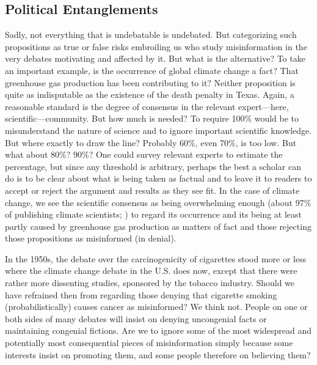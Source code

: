 \documentclass[11pt]{article}
\begin{document}
\subsection{Political Entanglements}

Sadly, not everything that is undebatable is undebated. But categorizing such propositions as true or false risks embroiling us who study misinformation in the very debates motivating and affected by it. But what is the alternative? To take an important example, is the occurrence of global climate change a fact? That greenhouse gas production has been contributing to it? Neither proposition is quite as indisputable as the existence of the death penalty in Texas. Again, a reasonable standard is the degree of consensus in the relevant expert---here, scientific---community. But how much is needed? To require 100\% would be to misunderstand the nature of science and to ignore important scientific knowledge. But where exactly to draw the line? Probably 60\%, even 70\%, is too low. But what about 80\%? 90\%? One could survey relevant experts to estimate the percentage, but since any threshold is arbitrary, perhaps the best a scholar can do is to be clear about what is being taken as factual and to leave it to readers to accept or reject the argument and results as they see fit. In the case of climate change, we see the scientific consensus as being overwhelming enough (about 97\% of publishing climate scientists; \citealt{cook2016}) to regard its occurrence and its being at least partly caused by greenhouse gas production as matters of fact \citep{ipcc2013} and those rejecting those propositions as misinformed (in denial).

In the 1950s, the debate over the carcinogenicity of cigarettes stood more or less where the climate change debate in the U.S. does now, except that there were rather more dissenting studies, sponsored by the tobacco industry. Should we have refrained then from regarding those denying that cigarette smoking (probabilistically) causes cancer as misinformed? We think not. People on one or both sides of many debates will insist on denying uncongenial facts or maintaining congenial fictions. Are we to ignore some of the most widespread and potentially most consequential pieces of misinformation simply because some interests insist on promoting them, and some people therefore on believing them?
\end{document}
